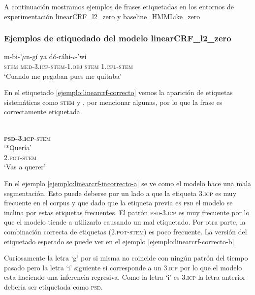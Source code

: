 \documentclass[letterpaper,12pt,oneside]{book}
\theoremstyle{definition}
\begin{document}
A continuación mostramos ejemplos de frases etiquetadas en los entornos de experimentación \textsf{linearCRF\_l2\_zero} y \textsf{baseline\_HMMLike\_zero}

\subsubsection{Ejemplos de etiquedado del modelo \textsf{linearCRF\_l2\_zero}}

\begin{exe}
    \ex {} {m-bi-'$\mu$n-gí} {ya} {dó-ráhi-$\iota$-'wi}\\
    {\textsc{stem}} {\textsc{med-3.icp-stem-1.obj}} {\textsc{stem}} {\textsc{1.cpl-stem}}\\
    \trans `Cuando me pegaban pues me quitaba' \label{ejemplo:linearcrf-correcto}
\end{exe}

En el etiquetado \ref{ejemplo:linearcrf-correcto} vemos la aparición de etiquetas sistemáticas como \textsc{stem} y , por mencionar algunas, por lo que la frase es correctamente etiquetada.

\begin{exe}
\ex \begin{xlist}
    \ex {}\\
    {\textbf{\textsc{psd-3.icp}}-\textsc{stem}}\\
    \trans `*Quería' \label{ejemplo:linearcrf-incorrecto-a}
    \ex {}\\
    {\textsc{2.pot-stem}}\\
    \trans `Vas a querer'\label{ejemplo:linearcrf-correcto-b}
    \end{xlist}
\end{exe}

En el ejemplo \ref{ejemplo:linearcrf-incorrecto-a} se ve como el modelo hace una mala segmentación. Esto puede deberse por un lado a que la etiqueta \textsc{3.icp} es muy frecuente en el corpus y que dado que la etiqueta previa es \textsc{psd} el modelo se inclina por estas etiquetas frecuentes. El patrón \textsc{psd-3.icp} es muy frecuente por lo que el modelo tiende a utilizarlo causando un mal etiquetado. Por otra parte, la combinación correcta de etiquetas (\textsc{2.pot-stem}) es poco frecuente. La versión del etiquetado esperado se puede ver en el ejemplo \ref{ejemplo:linearcrf-correcto-b}

Curiosamente la letra `g' por si misma no coincide con ningún patrón del tiempo pasado pero la letra `i' siguiente si corresponde a un \textsc{3.icp} por lo que el modelo esta haciendo una inferencia regresiva. Como  la letra `i' es \textsc{3.icp} la letra anterior debería ser etiquetada como \textsc{psd}.
\end{document}
